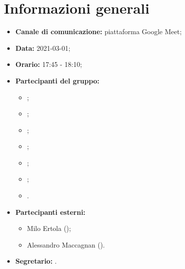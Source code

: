 \section{Informazioni generali}
\begin{itemize}
\item \textbf{Canale di comunicazione:} piattaforma Google Meet;
\item \textbf{Data:} 2021-03-01;
\item \textbf{Orario:} 17:45 - 18:10;
\item \textbf{Partecipanti del gruppo:}
	\begin{itemize}
	\item \MDI ;
	\item \MB ;
	\item \GB ;
	\item \VAS ;
	\item \FD ;
	\item \NM ;
	\item \SB .
	\end{itemize}
\item \textbf{Partecipanti esterni:}
	\begin{itemize}
	\item Milo Ertola (\Proponente);
	\item Alessandro Maccagnan (\Proponente).
	\end{itemize}
\item \textbf{Segretario:} \MDI .

\end{itemize}